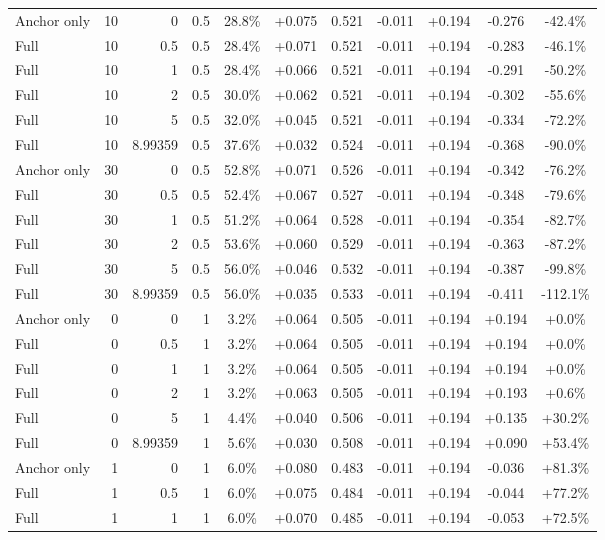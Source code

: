 \begin{table}[htbp]
\begin{tabular}{lrrrccccccc}
Anchor only & 10 & 0 & 0.5 & 28.8\% & +0.075 & 0.521 & -0.011 & +0.194 & -0.276 & -42.4\% \\
Full & 10 & 0.5 & 0.5 & 28.4\% & +0.071 & 0.521 & -0.011 & +0.194 & -0.283 & -46.1\% \\
Full & 10 & 1 & 0.5 & 28.4\% & +0.066 & 0.521 & -0.011 & +0.194 & -0.291 & -50.2\% \\
Full & 10 & 2 & 0.5 & 30.0\% & +0.062 & 0.521 & -0.011 & +0.194 & -0.302 & -55.6\% \\
Full & 10 & 5 & 0.5 & 32.0\% & +0.045 & 0.521 & -0.011 & +0.194 & -0.334 & -72.2\% \\
Full & 10 & 8.99359 & 0.5 & 37.6\% & +0.032 & 0.524 & -0.011 & +0.194 & -0.368 & -90.0\% \\
Anchor only & 30 & 0 & 0.5 & 52.8\% & +0.071 & 0.526 & -0.011 & +0.194 & -0.342 & -76.2\% \\
Full & 30 & 0.5 & 0.5 & 52.4\% & +0.067 & 0.527 & -0.011 & +0.194 & -0.348 & -79.6\% \\
Full & 30 & 1 & 0.5 & 51.2\% & +0.064 & 0.528 & -0.011 & +0.194 & -0.354 & -82.7\% \\
Full & 30 & 2 & 0.5 & 53.6\% & +0.060 & 0.529 & -0.011 & +0.194 & -0.363 & -87.2\% \\
Full & 30 & 5 & 0.5 & 56.0\% & +0.046 & 0.532 & -0.011 & +0.194 & -0.387 & -99.8\% \\
Full & 30 & 8.99359 & 0.5 & 56.0\% & +0.035 & 0.533 & -0.011 & +0.194 & -0.411 & -112.1\% \\
Anchor only & 0 & 0 & 1 & 3.2\% & +0.064 & 0.505 & -0.011 & +0.194 & +0.194 & +0.0\% \\
Full & 0 & 0.5 & 1 & 3.2\% & +0.064 & 0.505 & -0.011 & +0.194 & +0.194 & +0.0\% \\
Full & 0 & 1 & 1 & 3.2\% & +0.064 & 0.505 & -0.011 & +0.194 & +0.194 & +0.0\% \\
Full & 0 & 2 & 1 & 3.2\% & +0.063 & 0.505 & -0.011 & +0.194 & +0.193 & +0.6\% \\
Full & 0 & 5 & 1 & 4.4\% & +0.040 & 0.506 & -0.011 & +0.194 & +0.135 & +30.2\% \\
Full & 0 & 8.99359 & 1 & 5.6\% & +0.030 & 0.508 & -0.011 & +0.194 & +0.090 & +53.4\% \\
Anchor only & 1 & 0 & 1 & 6.0\% & +0.080 & 0.483 & -0.011 & +0.194 & -0.036 & +81.3\% \\
Full & 1 & 0.5 & 1 & 6.0\% & +0.075 & 0.484 & -0.011 & +0.194 & -0.044 & +77.2\% \\
Full & 1 & 1 & 1 & 6.0\% & +0.070 & 0.485 & -0.011 & +0.194 & -0.053 & +72.5\% \\

\end{tabular}
\end{table}
